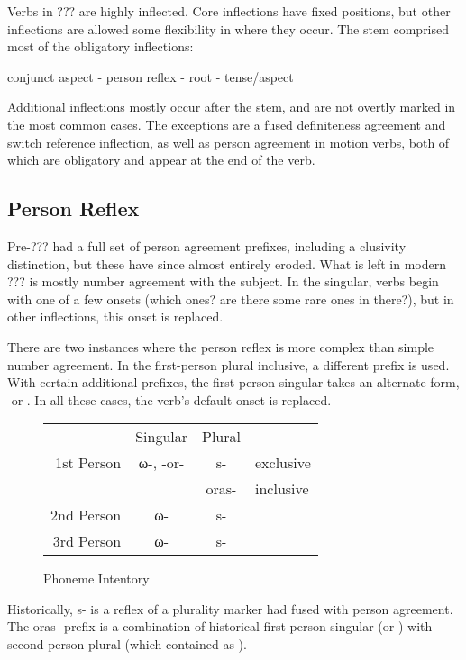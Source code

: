 \documentclass[12pt]{book} %
\begin{document}
Verbs in ??? are highly inflected.
Core inflections have fixed positions, but other inflections are allowed some flexibility in where they occur.
The stem comprised most of the obligatory inflections:
\begin{center}
	conjunct aspect - person reflex - root - tense/aspect
\end{center}
Additional inflections {\color{red}mostly} occur after the stem, and are not overtly marked in the most common cases.
The exceptions are a fused definiteness agreement and switch reference inflection, as well as person agreement in motion verbs, both of which are obligatory and appear at the end of the verb.

\subsection{Person Reflex}

Pre-??? had a full set of person agreement prefixes, including a clusivity distinction, but these have since almost entirely eroded.
What is left in modern ??? is mostly number agreement with the subject.
In the singular, verbs begin with one of a few onsets {\color{red} (which ones? are there some rare ones in there?)}, but in other inflections, this onset is replaced.

There are two instances where the person reflex is more complex than simple number agreement.
In the first-person plural inclusive, a different prefix is used.
With certain additional prefixes, the first-person singular takes an alternate form, -or-.
In all these cases, the verb's default onset is replaced.

\begin{figure}[H]
\centering
	\begin{tabular}{rccl}
				& Singular	& Plural				\\
	1st Person	& ω-, -or-	& s-		& exclusive	\\
				&			& oras-	& inclusive	\\
	2nd Person	& ω-		& s-					\\
	3rd Person	& ω-		& s-					\\
	\end{tabular}
\caption{Phoneme Intentory}\label{t:phonemes}
\end{figure}

{\color{cyan}
Historically, s- is a reflex of a plurality marker had fused with person agreement.
The oras- prefix is a combination of historical first-person singular (or-) with second-person plural (which contained as-).
}
\end{document}
